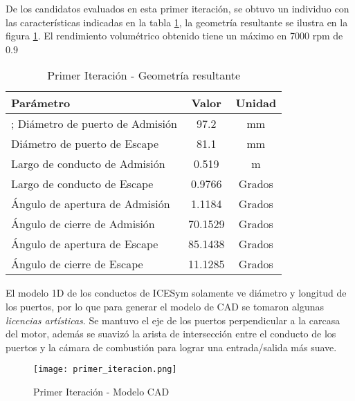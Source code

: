 De los candidatos evaluados en esta primer iteración, se obtuvo un individuo
con las características indicadas en la tabla \ref{tab:primer_it}, la geometría
resultante se ilustra en la figura \ref{fig:primer_it}.
%
El rendimiento volumétrico obtenido tiene un máximo en 7000 rpm de 0.9

\begin{table}
    \centering
    \begin{tabular}{lcc} \toprule
      Parámetro                      & Valor   & Unidad \\ \midrule;
      Diámetro de puerto de Admisión & 97.2    & mm     \\
      Diámetro de puerto de Escape   & 81.1    & mm     \\
      Largo de conducto de Admisión  & 0.519   & m      \\
      Largo de conducto de Escape    & 0.9766  & Grados \\
      Ángulo de apertura de Admisión & 1.1184  & Grados \\
      Ángulo de cierre de Admisión   & 70.1529 & Grados \\
      Ángulo de apertura de Escape   & 85.1438 & Grados \\
      Ángulo de cierre de Escape     & 11.1285 & Grados \\ \bottomrule
    \end{tabular}
    \caption{Primer Iteración - Geometría resultante}
    \label{tab:primer_it}
\end{table}

El modelo 1D de los conductos de ICESym solamente ve diámetro y longitud  de los
puertos, por lo que para generar el modelo de CAD se tomaron algunas
\emph{licencias artísticas}.
%
Se mantuvo el eje de los puertos perpendicular a la carcasa del motor, además se
suavizó la arista de intersección entre el conducto de los puertos y la cámara
de combustión para lograr una entrada/salida más suave.

\begin{figure}
  \centering
  \texttt{[image: primer\_iteracion.png]}
  \caption{Primer Iteración - Modelo CAD}
  \label{fig:primer_it}
\end{figure}
